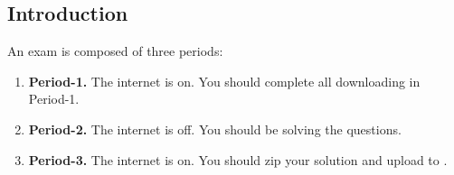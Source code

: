 \subsection{Introduction}

An exam is composed of three periods:
\begin{enumerate}[label=\roman*.]

	\item \textbf{Period-1.} 
	The internet is on. You should complete all downloading in Period-1.

	\item \textbf{Period-2.} 
	The internet is oﬀ. You should be solving the questions.

	\item \textbf{Period-3. }
	The internet is on. You should zip your solution and upload to \YULearn.
	
\end{enumerate}